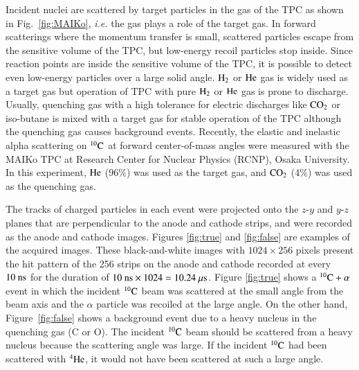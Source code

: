 \documentclass{jps-cp}
\begin{document}
Incident nuclei are scattered by target particles in the gas of the TPC as shown in Fig.~\ref{fig:MAIKo}, 
{\it i.e.} the gas plays a role of the target gas.
In forward scatterings where the momentum transfer is small,
scattered particles escape from the sensitive volume of the TPC, but low-energy recoil particles stop inside.
Since reaction points are inside the sensitive volume of the TPC,
it is possible to detect even low-energy particles over a large solid angle.
$\rm{H}_{2}$ or $\rm{He}$ gas is widely used as a target gas
but operation of TPC with pure $\rm{H}_{2}$ or $\rm{He}$ gas is prone to discharge.
Usually, quenching gas with a high tolerance for electric discharges
like $\rm{CO}_{2}$ or iso-butane is mixed with a target gas
for stable operation of the TPC although the quenching gas causes background events.
Recently, the elastic and inelastic alpha scattering on ${}^{10}\rm{C}$ at forward center-of-mass angles
were measured with the MAIKo TPC at Research Center for Nuclear Physics (RCNP), Osaka University.
In this experiment, $\rm{He}$ (96\%) was used as the target gas, and $\rm{CO}_{2}$ (4\%) was used as the quenching gas.

The tracks of charged particles in each event were projected onto the $z$-$y$ and $y$-$z$ planes 
that are perpendicular to the anode and cathode strips, and were recorded as the anode and cathode images.
Figures \ref{fig:true} and \ref{fig:false} are examples of the acquired images.
These black-and-white images with $1024\times 256$ pixels present the hit pattern of the 256 strips 
on the anode and cathode recorded
at every $10~\rm{ns}$ for the duration of $10~\rm{ns}\times 1024 = 10.24~\rm{\mu s}$.
Figure \ref{fig:true} shows a ${}^{10}\rm{C}+\alpha$ event
in which the incident ${}^{10}\rm{C}$ beam was scattered at the small angle from the beam axis and the $\alpha$ particle was
recoiled at the large angle.
On the other hand, Figure~\ref{fig:false} shows a background event due to a heavy nucleus in the quenching gas (C or O).
The incident ${}^{10}\rm{C}$ beam should be scattered from a heavy nucleus because the scattering angle was large.
If the incident ${}^{10}\rm{C}$ had been scattered with ${}^{4}\rm{He}$,
it would not have been scattered at such a large angle.
\end{document}
